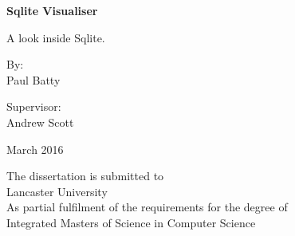 \begin{titlepage}
	\begin{center}
		\begin{huge}
			\textbf{Sqlite Visualiser}
		\end{huge}	
		
		\vspace{0.5cm}
		\normalsize A look inside Sqlite.
		
		\vspace{1.5cm}		
		
		\normalsize By:   \\
		\large Paul Batty
		
		\vspace{2.5cm}
		
		\normalsize Supervisor: \\
		\large Andrew Scott
		
		\vspace{1.5cm}
		
		\large March 2016
		
		\vfill 
		
		\normalsize
		The dissertation is submitted to \\
		Lancaster University \\
		As partial fulfilment of the requirements for the degree of \\
		Integrated Masters of Science in Computer Science \\
	\end{center} 
\end{titlepage}
